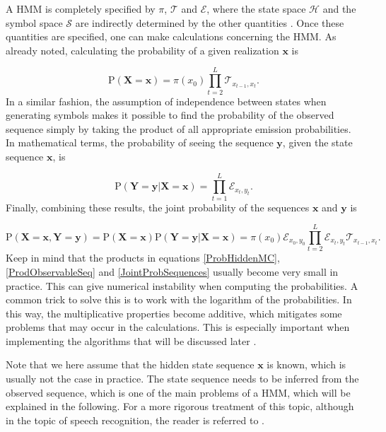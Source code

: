 \documentclass{article}
\begin{document}
A HMM is completely specified by $\pi$, $\mathcal{T}$ and $\mathcal{E}$, where the state space $\mathcal{H}$ and the symbol space $\mathcal{S}$ are indirectly determined by the other quantities \cite{Eddy04}. Once these quantities are specified, one can make calculations concerning the HMM. As already noted, calculating the probability of a given realization $\mathbf{x}$ is 

\begin{equation}
    \text{P}(\mathbf{X} = \mathbf{x}) = \pi(x_0)\prod_{t=2}^L\mathcal{T}_{x_{t-1}, x_t}.
    \label{ProbHiddenMC}
\end{equation}
In a similar fashion, the assumption of independence between states when generating symbols makes it possible to find the probability of the observed sequence simply by taking the product of all appropriate emission probabilities. In mathematical terms, the probability of seeing the sequence $\mathbf{y}$, given the state sequence $\mathbf{x}$, is 

\begin{equation}
    \text{P}(\mathbf{Y} = \mathbf{y}|\mathbf{X}= \mathbf{x}) = \prod_{t=1}^L\mathcal{E}_{x_t, y_t}.
    \label{ProdObservableSeq}
\end{equation}
Finally, combining these results, the joint probability of the sequences $\mathbf{x}$ and $\mathbf{y}$ is 

\begin{equation}
    \text{P}(\mathbf{X} = \mathbf{x}, \mathbf{Y}= \mathbf{y}) = \text{P}(\mathbf{X}= \mathbf{x})\text{P}(\mathbf{Y}= \mathbf{y}|\mathbf{X}= \mathbf{x}) = \pi(x_0)\mathcal{E}_{x_0, y_0}\prod_{t=2}^L\mathcal{E}_{x_t, y_t}\mathcal{T}_{x_{t-1}, x_t}.
    \label{JointProbSequences}
\end{equation}
Keep in mind that the products in equations \eqref{ProbHiddenMC}, \eqref{ProdObservableSeq} and \eqref{JointProbSequences} usually become very small in practice. This can give numerical instability when computing the probabilities. A common trick to solve this is to work with the logarithm of the probabilities. In this way, the multiplicative properties become additive, which mitigates some problems that may occur in the calculations. This is especially important when implementing the algorithms that will be discussed later \cite{Christianini2006}. 

Note that we here assume that the hidden state sequence $\mathbf{x}$ is known, which is usually not the case in practice. The state sequence needs to be inferred from the observed sequence, which is one of the main problems of a HMM, which will be explained in the following. For a more rigorous treatment of this topic, although in the topic of speech recognition, the reader is referred to \cite{Rabiner1989}.
\end{document}
